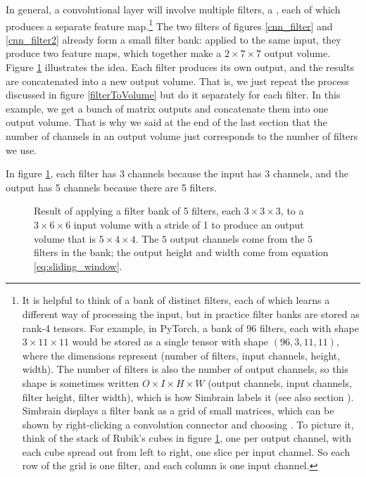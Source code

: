 In general, a convolutional layer will involve multiple filters, a , each of which produces a separate feature map.\footnote{It is helpful to think of a bank of distinct filters, each of which learns a different way of processing the input, but in practice filter banks are stored as rank-4 tensors. For example, in PyTorch, a bank of 96 filters, each with shape $3 \times 11 \times 11$ would be stored as a single tensor with shape $(96, 3, 11, 11)$, where the dimensions represent (number of filters, input channels, height, width). The number of filters is also the number of output channels, so this shape is sometimes written $O \times I \times H \times W$ (output channels, input channels, filter height, filter width), which is how Simbrain labels it (see also section ). Simbrain displays a filter bank as a grid of small matrices, which can be shown by right-clicking a convolution connector and choosing . To picture it, think of the stack of Rubik's cubes in figure \ref{filterBank}, one per output channel, with each cube spread out from left to right, one slice per input channel. So each row of the grid is one filter, and each column is one input channel.} The two filters of figures \ref{cnn_filter} and \ref{cnn_filter2} already form a small filter bank: applied to the same input, they produce two feature maps, which together make a $2 \times 7 \times 7$ output volume. Figure \ref{filterBank} illustrates the idea. Each filter produces its own output, and the results are concatenated into a new output volume. That is, we just repeat the process discussed in figure \ref{filterToVolume} but do it separately for each filter. In this example, we get a bunch of matrix outputs and concatenate them into one output volume. That is why we said at the end of the last section that the number of channels in an output volume just corresponds to the number of filters we use.

In figure \ref{filterBank}, each filter has 3 channels because the input has 3 channels, and the output has 5 channels because there are 5 filters.

\begin{figure}
\centering
{}
\caption[Soraya Boza and Jeff Yoshimi.]{Result of applying a filter bank of 5 filters, each $3 \times 3 \times 3$, to a $3 \times 6 \times 6$ input volume with a stride of 1 to produce an output volume that is $5 \times 4 \times 4$. The $5$ output channels come from the $5$ filters in the bank; the output height and width come from equation \ref{eq:sliding_window}.}
\label{filterBank}
\end{figure}

